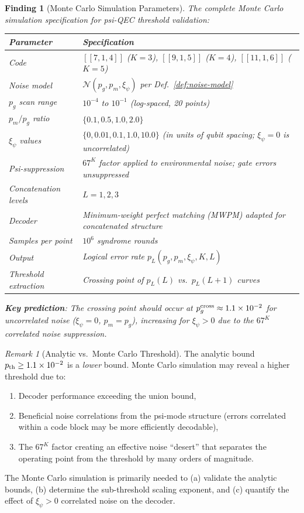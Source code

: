 \documentclass[11pt]{article}
\newtheorem{finding}[theorem]{Finding}
\theoremstyle{definition}
\theoremstyle{remark}
\newtheorem{remark}[theorem]{Remark}
\newcommand{\ee}[1]{\times 10^{#1}}
\begin{document}
\begin{finding}[Monte Carlo Simulation Parameters]
\label{finding:mc-params}
The complete Monte Carlo simulation specification for psi-QEC
threshold validation:

\begin{center}
\begin{tabular}{@{}lp{7cm}@{}}
\toprule
Parameter & Specification \\
\midrule
Code & $[[7,1,4]]$ ($K=3$), $[[9,1,5]]$ ($K=4$), $[[11,1,6]]$ ($K=5$) \\
Noise model & $\mathcal{N}(p_g, p_m, \xi_\psi)$ per
  Def.~\ref{def:noise-model} \\
$p_g$ scan range & $10^{-4}$ to $10^{-1}$ (log-spaced, 20 points) \\
$p_m / p_g$ ratio & $\{0.1, 0.5, 1.0, 2.0\}$ \\
$\xi_\psi$ values & $\{0, 0.01, 0.1, 1.0, 10.0\}$ (in units of qubit
  spacing; $\xi_\psi = 0$ is uncorrelated) \\
Psi-suppression & $67^K$ factor applied to environmental noise;
  gate errors unsuppressed \\
Concatenation levels & $L = 1, 2, 3$ \\
Decoder & Minimum-weight perfect matching (MWPM) adapted for
  concatenated structure \\
Samples per point & $10^6$ syndrome rounds \\
Output & Logical error rate $p_L(p_g, p_m, \xi_\psi, K, L)$ \\
Threshold extraction & Crossing point of $p_L(L)$ vs.\ $p_L(L{+}1)$
  curves \\
\bottomrule
\end{tabular}
\end{center}

\textbf{Key prediction}: The crossing point should occur at
$p_g^{\rm cross} \approx 1.1\ee{-2}$ for uncorrelated noise
($\xi_\psi = 0$, $p_m = p_g$), increasing for $\xi_\psi > 0$
due to the $67^K$ correlated noise suppression.
\end{finding}

\begin{remark}[Analytic vs.\ Monte Carlo Threshold]
\label{rem:analytic-vs-mc}
The analytic bound $p_{\rm th} \geq 1.1\ee{-2}$ is a \emph{lower}
bound. Monte Carlo simulation may reveal a higher threshold due to:
\begin{enumerate}[nosep]
  \item Decoder performance exceeding the union bound,
  \item Beneficial noise correlations from the psi-mode structure
    (errors correlated within a code block may be more efficiently
    decodable),
  \item The $67^K$ factor creating an effective noise ``desert'' that
    separates the operating point from the threshold by many orders
    of magnitude.
\end{enumerate}
The Monte Carlo simulation is primarily needed to (a) validate the
analytic bounds, (b) determine the sub-threshold scaling exponent, and
(c) quantify the effect of $\xi_\psi > 0$ correlated noise on the
decoder.
\end{remark}
\end{document}
